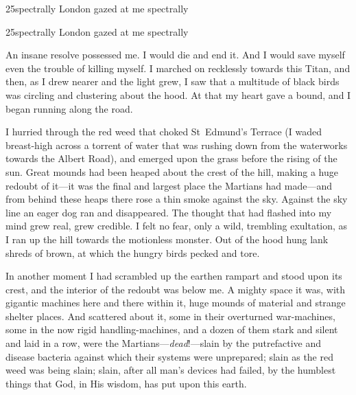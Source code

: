 \begin{letter}
	\begin{bwbigpic}
		[1.2] 
		{25spectrally} 
		{London gazed at me spectrally} 
	\end{bwbigpic}

\end{letter}

\begin{a4}
	\begin{bwbigpic}
		[1.1] 
		{25spectrally} 
		{London gazed at me spectrally} 
		\end{bwbigpic}
\end{a4}


An insane resolve possessed me. I would die and end it. And I would save myself even the trouble of killing myself. I marched on recklessly towards this Titan, and then, as I drew nearer and the light grew, I saw that a multitude of black birds was circling and clustering about the hood. At that my heart gave a bound, and I began running along the road.

I hurried through the red weed that choked St~Edmund's Terrace (I waded breast-high across a torrent of water that was rushing down from the waterworks towards the Albert Road), and emerged upon the grass before the rising of the sun. Great mounds had been heaped about the crest of the hill, making a huge redoubt of it—it was the final and largest place the Martians had made—and from behind these heaps there rose a thin smoke against the sky. Against the sky line an eager dog ran and disappeared. The thought that had flashed into my mind grew real, grew credible. I felt no fear, only a wild, trembling exultation, as I ran up the hill towards the motionless monster. Out of the hood hung lank shreds of brown, at which the hungry birds pecked and tore.


In another moment I had scrambled up the earthen rampart and stood upon its crest, and the interior of the redoubt was below me. A mighty space it was, with gigantic machines here and there within it, huge mounds of material and strange shelter places. And scattered about it, some in their overturned war-machines, some in the now rigid handling-machines, and a dozen of them stark and silent and laid in a row, were the Martians—\textit{dead}!—slain by the putrefactive and disease bacteria against which their systems were unprepared; slain as the red weed was being slain; slain, after all man's devices had failed, by the humblest things that God, in His wisdom, has put upon this earth.

